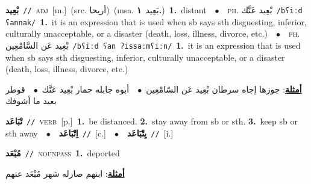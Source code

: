 \documentclass[10pt,a4paper,twoside]{article} %
\begin{document}
\begin{multicols}{2}
{\setlength\topsep{0pt}\textbf{\foreignlanguage{arabic}{بْعِيد}}\ {\color{gray}\texttt{//}\color{black}}\ \textsc{adj}\ [m.]\ (src. \color{gray}\foreignlanguage{arabic}{أريحا}\color{black})\ \color{gray}(msa. \foreignlanguage{arabic}{بَعِيد}~\foreignlanguage{arabic}{\textbf{١.}})\color{black}\ \textbf{1.}~distant\ \ $\bullet$\ \ \textsc{ph.} \color{gray} \foreignlanguage{arabic}{بْعِيد عَنَّك}\color{black}\ {\color{gray}\texttt{/{\sffamily bʕiːd ʕannak}/}\color{black}}\ \textbf{1.}~it is an expression that is used when sb says sth disguesting, inferior, culturally unacceptable, or a disaster (death, loss, illness, divorce, etc.)\ \ $\bullet$\ \ \textsc{ph.} \color{gray} \foreignlanguage{arabic}{بْعِيد عَن السَّامْعِين}\color{black}\ {\color{gray}\texttt{/{\sffamily bʕiːd ʕan ʔissaːmʕiːn}/}\color{black}}\ \textbf{1.}~it is an expression that is used when sb says sth disguesting, inferior, culturally unacceptable, or a disaster (death, loss, illness, divorce, etc.)\  \begin{flushright}\color{gray}\foreignlanguage{arabic}{\textbf{\underline{\foreignlanguage{arabic}{أمثلة}}}: جوزها إجاه سرطان بْعِيد عَن السّامْعِين\ $\bullet$\ \  أبوه جابله حمار بْعِيد عَنَّك\ $\bullet$\ \  قوطر بعيد ما أشوفك}\end{flushright}\color{black}} \vspace{2mm}

{\setlength\topsep{0pt}\textbf{\foreignlanguage{arabic}{تْبَاعَد}}\ {\color{gray}\texttt{//}\color{black}}\ \textsc{verb}\ [p.]\ \textbf{1.}~be distanced.  \textbf{2.}~stay away from sb or sth.  \textbf{3.}~keep sb or sth away\ \ $\bullet$\ \ \setlength\topsep{0pt}\textbf{\foreignlanguage{arabic}{اِتْبَاعَد}}\ {\color{gray}\texttt{//}\color{black}}\ [c.]\ \ $\bullet$\ \ \setlength\topsep{0pt}\textbf{\foreignlanguage{arabic}{يِتْبَاعَد}}\ {\color{gray}\texttt{//}\color{black}}\ [i.]\ } \vspace{2mm}

{\setlength\topsep{0pt}\textbf{\foreignlanguage{arabic}{مُبْعَد}}\ {\color{gray}\texttt{//}\color{black}}\ \textsc{noun\textunderscore pass}\ \textbf{1.}~deported\  \begin{flushright}\color{gray}\foreignlanguage{arabic}{\textbf{\underline{\foreignlanguage{arabic}{أمثلة}}}: ابنهم صارله شهر مُبْعَد عنهم}\end{flushright}\color{black}} \vspace{2mm}


\end{multicols}
\end{document}
